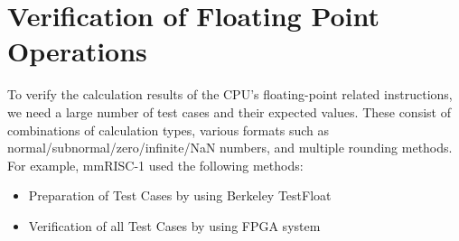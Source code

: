 \section{Verification of Floating Point Operations}
\label{sec:VEFIFYFLOATINGPOINT}

To verify the calculation results of the CPU’s floating-point related instructions, we need a large number of test cases and their expected values. These consist of combinations of calculation types, various formats such as normal/subnormal/zero/infinite/NaN numbers, and multiple rounding methods. For example, mmRISC-1 used the following methods:


\begin{itemize}
    \item Preparation of Test Cases by using Berkeley TestFloat
    \item Verification of all Test Cases by using FPGA system
\end{itemize}

